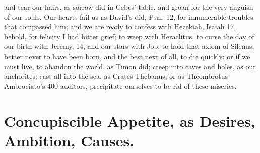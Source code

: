 {and tear our hairs, as sorrow did in Cebes' table, and groan for
the very anguish of our souls. Our hearts fail us as David's did, Psal.
 12, for innumerable troubles that compassed him; and we are ready
to confess with Hezekiah, Isaiah  17, behold, for felicity I had
bitter grief; to weep with Heraclitus, to curse the day of our birth
with Jeremy,  14, and our stars with Job: to hold that axiom of
Silenus, better never to have been born, and the best next of
all, to die quickly: or if we must live, to abandon the world, as Timon
did; creep into caves and holes, as our anchorites; cast all into the
sea, as Crates Thebanus; or as Theombrotus Ambrociato's 400 auditors,
precipitate ourselves to be rid of these miseries.

\section{Concupiscible Appetite, as Desires, Ambition, Causes.}

}
